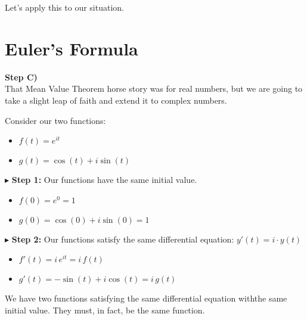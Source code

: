 \documentclass{ximera}
\begin{document}
Let's apply this to our situation. \\















\section{Euler's Formula}


\textbf{\textcolor{purple!85!blue}{Step C)}} \\


That Mean Value Theorem horse story was for real numbers, but we are going to take a slight leap of faith and extend it to complex numbers.




Consider our two functions:


\begin{itemize}
	\item $f(t) = e^{i t}$
	\item $g(t) = \cos(t) + i \sin(t)$
\end{itemize}




$\blacktriangleright$   \textbf{Step 1:} Our functions have the same initial value.

\begin{itemize}
	\item $f(0) = e^0 = 1$
	\item $g(0) = \cos(0) + i \sin(0) = 1$
\end{itemize}





$\blacktriangleright$   \textbf{Step 2:} Our functions satisfy the same differential equation: $y'(t) = i \cdot y(t)$



\begin{itemize}
	\item $f'(t) = i \, e^{i t} = i \, f(t)$
	\item $g'(t) = -\sin(t) + i \cos(t) = i \, g(t)$
\end{itemize}



We have two functions satisfying the same differential equation withthe same initial value.  They must, in fact, be the same function. \\
\end{document}
